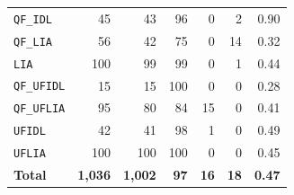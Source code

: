 \begin{table}[t]
\begin{tabular}{l r r r r r r}
		\quad\texttt{QF\_IDL}    & 45               & 43               & 96                     & 0           & 2           & 0.90          \\
		\quad\texttt{QF\_LIA}    & 56               & 42               & 75                     & 0           & 14          & 0.32          \\
		\quad\texttt{LIA}        & 100              & 99               & 99                     & 0           & 1           & 0.44          \\
		\quad\texttt{QF\_UFIDL}  & 15               & 15               & 100                    & 0           & 0           & 0.28          \\
		\quad\texttt{QF\_UFLIA}  & 95               & 80               & 84                     & 15          & 0           & 0.41          \\
		\quad\texttt{UFIDL}      & 42               & 41               & 98                     & 1           & 0           & 0.49          \\
		\quad\texttt{UFLIA}      & 100              & 100              & 100                    & 0           & 0           & 0.45          \\
		\hline
		\textbf{Total}           & \textbf{1{,}036} & \textbf{1{,}002} & \textbf{97}            & \textbf{16} & \textbf{18} & \textbf{0.47} \\
		\hline
	\end{tabular}
\end{table}
